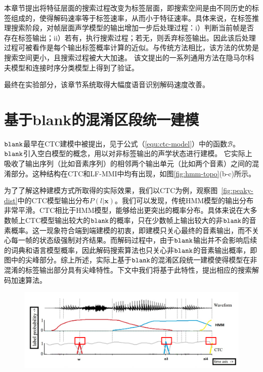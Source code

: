 本章节提出将特征层面的搜索过程改变为标签层面，即搜索空间是由不同历史的标签组成的，使得解码速率等于标签速率，从而小于特征速率。具体来说，在标签推理搜索阶段，对帧层面声学模型的输出增加一步后处理过程：i）判断当前帧是否存在标签输出；ii）若有，执行搜索过程；若无，则丢弃标签输出。因此该后处理过程可被看作是每个输出标签概率计算的近似。与传统方法相比，该方法的优势是搜索空间更小，且搜索过程被大大加速。
该文提出的一系列通用方法在隐马尔科夫模型和连接时序分类模型上得到了验证。

最终在实验部分，该章节系统取得大幅度语音识别解码速度改善。


\section{基于blank的混淆区段统一建模}
\label{chap:lsd-blank}

$\tt blank$最早在CTC建模中被提出，见于公式（\ref{equ:ctc-model}）中的函数$\mathcal{B}$。$\tt blank$引入空白模型的概念，用以对非标签输出的声学状态进行建模。
它实际上吸收了输出序列（比如音素序列）的相邻两个输出单元（比如两个音素）之间的混淆部分。这种结构在CTC和LF-MMI中均有出现，如图\ref{fig:hmm-topo}(b-c)所示。

为了了解这种建模方式所取得的实际效果，我们以CTC为例，观察图~\ref{fig:peaky-dist}中的CTC模型输出分布$P(l|\mathbf{x})$。我们可以发现，传统HMM模型的输出分布非常平滑。CTC相比于HMM模型，能够给出更突出的概率分布。具体来说在大多数帧上CTC模型输出较大的$\tt blank$的概率，只在少数帧上输出较大的非$\tt blank$的音素概率。这一现象符合端到端建模的初衷，即建模只关心最终的音素输出，而不关心每一帧的状态级强制对齐结果。而解码过程中，由于$\tt blank$输出并不会影响后续的词典和语言模型概率，因此解码搜索算法也只关心非$\tt blank$的音素输出概率，即图中的尖峰部分。综上所述，实际上基于$\tt blank$的混淆区段统一建模使得模型在非混淆的标签输出部分具有尖峰特性。下文中我们将基于此特性，提出相应的搜索解码加速算法。


\begin{figure}[!htp]
  \centering
    \captionstyle{\centering}
    \includegraphics[width=\textwidth]{figure/peaky_distribution.png}
\end{figure}



